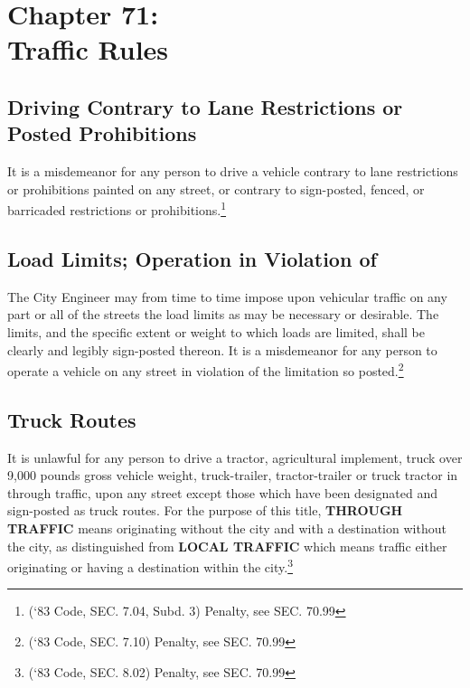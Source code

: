 \chapter*{Chapter 71: \\
	Traffic Rules}
    \vfill
    \minitoc
    \pagebreak


\section{Driving Contrary to Lane Restrictions or Posted Prohibitions}
It is a misdemeanor for any person to drive a vehicle contrary to lane restrictions or prohibitions painted on any street, or contrary to sign-posted, fenced, or barricaded restrictions or prohibitions.\footnote{(‘83 Code, SEC. 7.04, Subd. 3) Penalty, see SEC. 70.99}

\section{Load Limits; Operation in Violation of}
The City Engineer may from time to time impose upon vehicular traffic on any part or all of the streets the load limits as may be necessary or desirable. The limits, and the specific extent or weight to which loads are limited, shall be clearly and legibly sign-posted thereon. It is a misdemeanor for any person to operate a vehicle on any street in violation of the limitation so posted.\footnote{(‘83 Code, SEC. 7.10) Penalty, see SEC. 70.99}

\section{Truck Routes}
It is unlawful for any person to drive a tractor, agricultural implement, truck over 9,000 pounds gross vehicle weight, truck-trailer, tractor-trailer or truck tractor in through traffic, upon any street except those which have been designated and sign-posted as truck routes.  For the purpose of this title, \textbf{THROUGH TRAFFIC} means originating without the city and with a destination without the city, as distinguished from \textbf{LOCAL TRAFFIC} which means traffic either originating or having a destination within the city.\footnote{(‘83 Code, SEC. 8.02) Penalty, see SEC. 70.99}

